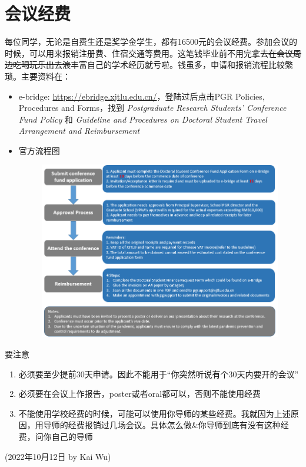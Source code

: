 \section{会议经费}

每位同学，无论是自费生还是奖学金学生，都有16500元的会议经费。参加会议的时候，可以用来报销注册费、住宿交通等费用。这笔钱毕业前不用完拿去\sout{在会议周边吃喝玩乐出去浪}丰富自己的学术经历就亏啦。钱虽多，申请和报销流程比较繁琐。主要资料在：
\begin{itemize}
    \item e-bridge: \url{https://ebridge.xjtlu.edu.cn/}，登陆过后点击PGR Policies, Procedures and Forms，找到 \textit{Postgraduate Research Students' Conference Fund Policy} 和 \textit{
    Guideline and Procedures on Doctoral Student Travel Arrangement and Reimbursement}
    \item 官方流程图
    \begin{figure}[H]
        \centering
        \includegraphics[width=0.9\columnwidth]{author-folder/Kai.Wu/fund-flowchart.png}
    \end{figure}
\end{itemize}

要注意
\begin{enumerate}
    \item 必须要至少提前30天申请。因此不能用于“你突然听说有个30天内要开的会议”
    \item 必须要在会议上作报告，poster或者oral都可以，否则不能使用经费
    \item 不能使用学校经费的时候，可能可以使用你导师的某些经费。我就因为上述原因，用导师的经费报销过几场会议。具体怎么做\&你导师到底有没有这种经费，问你自己的导师
\end{enumerate}


\begin{flushright}
(2022年10月12日 by Kai Wu)
\end{flushright}